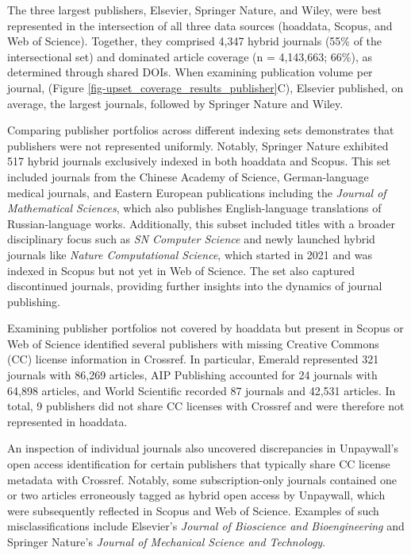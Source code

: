 \documentclass[a4paper,man,floatsintext,longtable,noextraspace,10pt]{apa6}
\begin{document}
The three largest publishers, Elsevier, Springer Nature, and Wiley, were
best represented in the intersection of all three data sources
(hoaddata, Scopus, and Web of Science). Together, they comprised 4,347
hybrid journals (55\% of the intersectional set) and dominated article
coverage (n = 4,143,663; 66\%), as determined through shared DOIs. When
examining publication volume per journal, (Figure
\ref{fig-upset_coverage_results_publisher}C), Elsevier published, on
average, the largest journals, followed by Springer Nature and Wiley.

Comparing publisher portfolios across different indexing sets
demonstrates that publishers were not represented uniformly. Notably,
Springer Nature exhibited 517 hybrid journals exclusively indexed in
both hoaddata and Scopus. This set included journals from the Chinese
Academy of Science, German-language medical journals, and Eastern
European publications including the \emph{Journal of Mathematical
Sciences}, which also publishes English-language translations of
Russian-language works. Additionally, this subset included titles with a
broader disciplinary focus such as \emph{SN Computer Science} and newly
launched hybrid journals like \emph{Nature Computational Science}, which
started in 2021 and was indexed in Scopus but not yet in Web of Science.
The set also captured discontinued journals, providing further insights
into the dynamics of journal publishing.

Examining publisher portfolios not covered by hoaddata but present in
Scopus or Web of Science identified several publishers with missing
Creative Commons (CC) license information in Crossref. In particular,
Emerald represented 321 journals with 86,269 articles, AIP Publishing
accounted for 24 journals with 64,898 articles, and World Scientific
recorded 87 journals and 42,531 articles. In total, 9 publishers did not
share CC licenses with Crossref and were therefore not represented in
hoaddata.

An inspection of individual journals also uncovered discrepancies in
Unpaywall's open access identification for certain publishers that
typically share CC license metadata with Crossref. Notably, some
subscription-only journals contained one or two articles erroneously
tagged as hybrid open access by Unpaywall, which were subsequently
reflected in Scopus and Web of Science. Examples of such
misclassifications include Elsevier's \emph{Journal of Bioscience and
Bioengineering} and Springer Nature's \emph{Journal of Mechanical
Science and Technology}.
\end{document}
